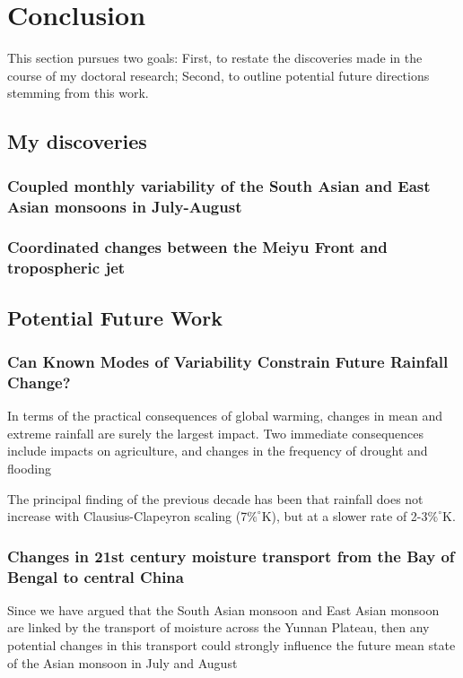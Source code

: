 \chapter{Conclusion}

This section pursues two goals: First, to restate the discoveries made in the course of my doctoral research; Second, to outline potential future directions stemming from this work.

\section{My discoveries}

\subsection{Coupled monthly variability of the South Asian and East Asian monsoons in July-August}

\subsection{Coordinated changes between the Meiyu Front and tropospheric jet}

\section{Potential Future Work}

\subsection{Can Known Modes of Variability Constrain Future Rainfall Change?}

In terms of the practical consequences of global warming, changes in mean and extreme rainfall are surely the largest impact. Two immediate consequences include impacts on agriculture, and changes in the frequency of drought and flooding

The principal finding of the previous decade has been that rainfall does not increase with Clausius-Clapeyron scaling (7$\%^{\circ}$K), but at a slower rate of 2-3$\%^{\circ}$K.

\subsection{Changes in 21st century moisture transport from the Bay of Bengal to central China}

Since we have argued that the South Asian monsoon and East Asian monsoon are linked by the transport of moisture across the Yunnan Plateau, then any potential changes in this transport could strongly influence the future mean state of the Asian monsoon in July and August

